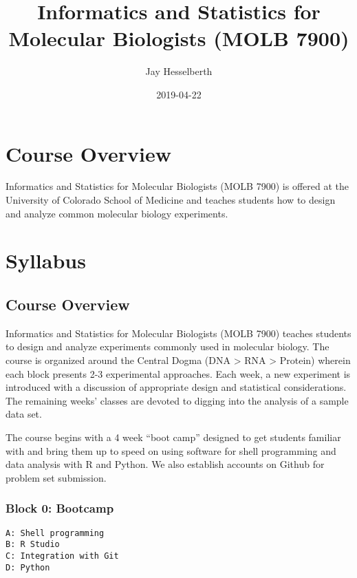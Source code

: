 \documentclass[]{book}
\title{Informatics and Statistics for Molecular Biologists (MOLB 7900)}
\author{Jay Hesselberth}
\date{2019-04-22}
\begin{document}
\maketitle

{
\setcounter{tocdepth}{1}
\tableofcontents
}
\chapter*{Course Overview}\label{course-overview}

Informatics and Statistics for Molecular Biologists (MOLB 7900) is
offered at the University of Colorado School of Medicine and teaches
students how to design and analyze common molecular biology experiments.

\chapter*{Syllabus}\label{syllabus}

\section{Course Overview}\label{course-overview-1}

Informatics and Statistics for Molecular Biologists (MOLB 7900) teaches
students to design and analyze experiments commonly used in molecular
biology. The course is organized around the Central Dogma (DNA
\textgreater{} RNA \textgreater{} Protein) wherein each block presents
2-3 experimental approaches. Each week, a new experiment is introduced
with a discussion of appropriate design and statistical considerations.
The remaining weeks' classes are devoted to digging into the analysis of
a sample data set.

The course begins with a 4 week ``boot camp'' designed to get students
familiar with and bring them up to speed on using software for shell
programming and data analysis with R and Python. We also establish
accounts on Github for problem set submission.

\subsection{Block 0: Bootcamp}\label{block-0-bootcamp}

\begin{verbatim}
A: Shell programming
B: R Studio
C: Integration with Git
D: Python
\end{verbatim}
\end{document}
